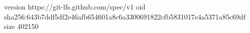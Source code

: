 version https://git-lfs.github.com/spec/v1
oid sha256:643b7ddf5df2e46afb654601a8c6a3300691822cfb5831017e4a5371a85c69df
size 402150
